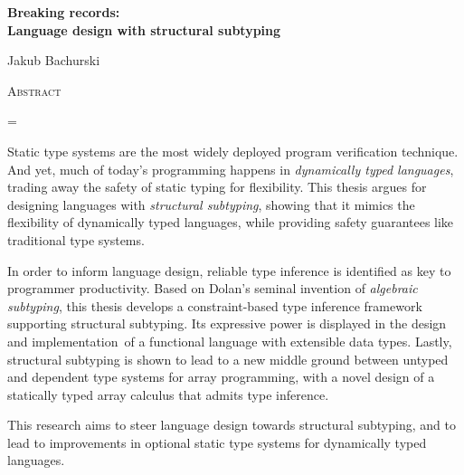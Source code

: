 \vspace*{1cm}
\begin{center}
  \Large
  \textbf{Breaking records: \\ Language design with structural subtyping}
\end{center}
\ifanonymised\else
\vspace{0.5cm}
\begin{center}
  \Large Jakub Bachurski
\end{center}
\fi
\vspace{1.5cm}
\begin{center}
  \Large
  \textsc{Abstract}
\end{center}
\vspace{0.2cm}
%
\begin{center}
\emergencystretch=\maxdimen
{}
\begin{minipage}{0.61\textwidth}
    \setlength{\parindent}{1em}
    Static type systems are the most widely deployed program verification technique. 
    And yet, much of today's programming happens in \emph{dynamically typed languages}, trading away the safety of static typing for flexibility. 
    This thesis argues for designing languages with \emph{structural subtyping}, showing that it mimics the flexibility of dynamically typed languages, while providing safety guarantees like traditional type systems. 

    In order to inform language design, reliable type inference is identified as key to programmer productivity. 
    Based on Dolan's seminal invention of \emph{algebraic subtyping}, this thesis develops a constraint-based type inference framework supporting structural subtyping. 
    Its expressive power is displayed in the design and implementation~of a functional language with extensible data types. 
    Lastly, structural subtyping is shown to lead to a new middle ground between untyped and dependent type systems for array programming, with a novel design of a statically typed array calculus that admits type inference.

    This research aims to steer language design towards structural subtyping, and to lead to improvements in optional static type systems for dynamically typed languages.
\end{minipage}
\end{center}